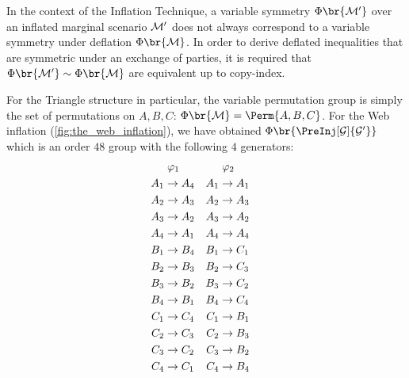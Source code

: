 \documentclass[aps, 10pt, english, twoside, pra, nofootinbib, tightenlines, longbibliography, superscriptaddress]{revtex4-1}
\begin{document}
    In the context of the Inflation Technique, a variable symmetry $\Phi\br{\mscenario'}$ over an inflated marginal scenario $\mathcal{M}'$ does not always correspond to a variable symmetry under deflation $\Phi\br{\mscenario}$. In order to derive deflated inequalities that are symmetric under an exchange of parties, it is required that $\Phi\br{\mscenario'} \sim \Phi\br{\mscenario}$ are equivalent up to copy-index.

    For the Triangle structure in particular, the variable permutation group is simply the set of permutations on $A, B, C$: $\Phi\br{\mscenario} = \Perm{A, B, C}$. For the Web inflation (\cref{fig:the_web_inflation}), we have obtained $\gp\br{\PreInj[\graph]{\graph'}}$ which is an order $48$ group with the following $4$ generators:
    \begin{equation*}
    \begin{aligned}[c]
    &\hspace{1mm}\varphi_1 \\
    A_1 &\to A_4 \\A_2 &\to A_3 \\A_3 &\to A_2 \\A_4 &\to A_1 \\B_1 &\to B_4 \\B_2 &\to B_3 \\B_3 &\to B_2 \\B_4 &\to B_1 \\C_1 &\to C_4 \\C_2 &\to C_3 \\C_3 &\to C_2 \\C_4 &\to C_1
    \end{aligned}
    \quad
    \begin{aligned}[c]
    &\hspace{1mm}\varphi_2 \\
    A_1 &\to A_1 \\A_2 &\to A_3 \\A_3 &\to A_2 \\A_4 &\to A_4 \\B_1 &\to C_1 \\B_2 &\to C_3 \\B_3 &\to C_2 \\B_4 &\to C_4 \\C_1 &\to B_1 \\C_2 &\to B_3 \\C_3 &\to B_2 \\C_4 &\to B_4
    \end{aligned}
    \quad
    \begin{aligned}[c]

\end{aligned}
\end{equation*}
\end{document}
